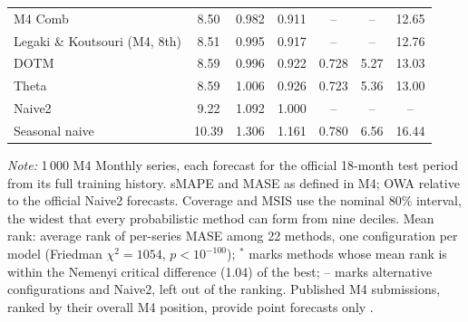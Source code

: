 \begin{table}[!htbp]
\begin{threeparttable}
\begin{tabular}{lcccccc}
M4 Comb & 8.50 & 0.982 & 0.911 & -- & -- & 12.65 \\
Legaki \& Koutsouri (M4, 8th) & 8.51 & 0.995 & 0.917 & -- & -- & 12.76 \\
DOTM & 8.59 & 0.996 & 0.922 & 0.728 & 5.27 & 13.03 \\
Theta & 8.59 & 1.006 & 0.926 & 0.723 & 5.36 & 13.00 \\
Naive2 & 9.22 & 1.092 & 1.000 & -- & -- & -- \\
Seasonal naive & 10.39 & 1.306 & 1.161 & 0.780 & 6.56 & 16.44 \\
\bottomrule
\end{tabular}
\begin{tablenotes}[flushleft]\footnotesize
\item \textit{Note:} 1\,000 M4 Monthly series, each forecast for the official 18-month test period from its full training history. sMAPE and MASE as defined in M4; OWA relative to the official Naive2 forecasts. Coverage and MSIS use the nominal 80\% interval, the widest that every probabilistic method can form from nine deciles. Mean rank: average rank of per-series MASE among 22 methods, one configuration per model (Friedman $\chi^2 = 1054$, $p < 10^{-100}$); $^\ast$ marks methods whose mean rank is within the Nemenyi critical difference (1.04) of the best; -- marks alternative configurations and Naive2, left out of the ranking. Published M4 submissions, ranked by their overall M4 position, provide point forecasts only \citep{makridakis2020m4, smyl2020hybrid, monteromanso2020fforma}.
\end{tablenotes}
\end{threeparttable}
\end{table}
